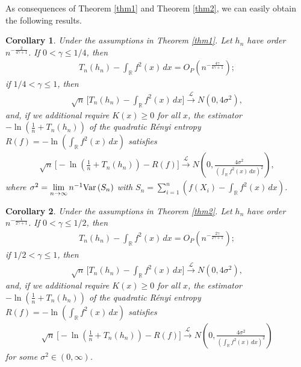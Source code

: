 \documentclass[11pt]{article}
\newtheorem {corollary}{Corollary}[section]
\def\R{{\mathbb R}}
\def\Var{{\mathop {{\rm Var\, }}}}
\begin{document}
As consequences of Theorem \ref{thm1} and Theorem \ref{thm2}, we can easily obtain the following results.
\begin{corollary} \label{corollary1}
Under the assumptions in Theorem \ref{thm1}. Let $h_n$ have order $n^{-\frac{2}{4\gamma+1}}$. If $0 < \gamma \le 1/4$,  then 
\begin{align} \label{opt1}
T_n(h_n)-\int_{\R} f^2(x)\,dx=O_P(n^{-\frac{4\gamma}{4\gamma+1}});
\end{align}
if $1/4<\gamma\leq 1$, then
\begin{align} \label{clt1}
\sqrt{n}\, \Big[T_n(h_n)-\int_{\R} f^2(x)\,dx\Big]\overset{\mathcal{L}}{\longrightarrow} N(0,4\sigma^2),
\end{align}
and, if we additional require $K(x)\geq 0$ for all $x$, the estimator  $-\ln (\frac{1}{n}+T_n(h_n))$ of the quadratic R\'{e}nyi entropy  $R(f)=-\ln (\int_{\R} f^2(x)\,dx)$ satisfies 
\begin{align} \label{cltr1}
\sqrt{n}\, \Big[-\ln (\frac{1}{n}+T_n(h_n))-R(f)\Big]\overset{\mathcal{L}}{\longrightarrow} N\left(0,\frac{4\sigma^2}{(\int_{\R} f^2(x)\,dx)^2}\right),
\end{align}
where $\sigma^2=\lim\limits_{n\to\infty} n^{-1}\Var(S_n)$ with $S_n=\sum\limits^n_{i=1}\left(f(X_i)-\int_{\R} f^2(x)\, dx\right)$.
\end{corollary} 

\begin{corollary} \label{corollary2}
Under the assumptions in Theorem \ref{thm2}. Let $h_n$ have order $n^{-\frac{1}{2\gamma+1}}$. If $0 < \gamma \le 1/2$,  then 
\begin{align} \label{opt2}
T_n(h_n)-\int_{\R} f^2(x)\,dx=O_P(n^{-\frac{2\gamma}{2\gamma+1}});
\end{align}
if $1/2<\gamma\leq 1$, then
\begin{align} \label{clt2}
\sqrt{n}\, \Big[T_n(h_n)-\int_{\R} f^2(x)\,dx\Big]\overset{\mathcal{L}}{\longrightarrow} N(0,4\sigma^2),
\end{align}
and, if we additional require $K(x)\geq 0$ for all $x$,  the estimator  $-\ln (\frac{1}{n}+T_n(h_n))$ of the quadratic R\'{e}nyi entropy  $R(f)=-\ln (\int_{\R} f^2(x)\,dx)$ satisfies 
\begin{align} \label{cltr2}
\sqrt{n}\, \Big[-\ln (\frac{1}{n}+T_n(h_n))-R(f)\Big]\overset{\mathcal{L}}{\longrightarrow} N\left(0,\frac{4\sigma^2}{(\int_{\R} f^2(x)\,dx)^2}\right)
\end{align}
for some $\sigma^2\in(0,\infty)$.
\end{corollary} 
\end{document}
